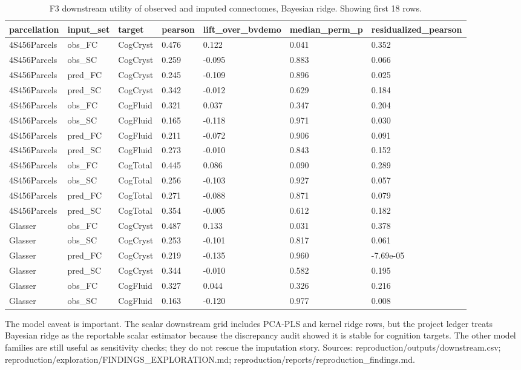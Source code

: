\documentclass{article}
\begin{document}
\begin{table}[H]
\centering
\scriptsize
\caption{F3 downstream utility of observed and imputed connectomes, Bayesian ridge. Showing first 18 rows.}
\label{tab:f3}
\begin{tabular}{lllllll}
\toprule
parcellation & input\_set & target & pearson & lift\_over\_bvdemo & median\_perm\_p & residualized\_pearson \\
\midrule
4S456Parcels & obs\_FC & CogCryst & 0.476 & 0.122 & 0.041 & 0.352 \\
4S456Parcels & obs\_SC & CogCryst & 0.259 & -0.095 & 0.883 & 0.066 \\
4S456Parcels & pred\_FC & CogCryst & 0.245 & -0.109 & 0.896 & 0.025 \\
4S456Parcels & pred\_SC & CogCryst & 0.342 & -0.012 & 0.629 & 0.184 \\
4S456Parcels & obs\_FC & CogFluid & 0.321 & 0.037 & 0.347 & 0.204 \\
4S456Parcels & obs\_SC & CogFluid & 0.165 & -0.118 & 0.971 & 0.030 \\
4S456Parcels & pred\_FC & CogFluid & 0.211 & -0.072 & 0.906 & 0.091 \\
4S456Parcels & pred\_SC & CogFluid & 0.273 & -0.010 & 0.843 & 0.152 \\
4S456Parcels & obs\_FC & CogTotal & 0.445 & 0.086 & 0.090 & 0.289 \\
4S456Parcels & obs\_SC & CogTotal & 0.256 & -0.103 & 0.927 & 0.057 \\
4S456Parcels & pred\_FC & CogTotal & 0.271 & -0.088 & 0.871 & 0.079 \\
4S456Parcels & pred\_SC & CogTotal & 0.354 & -0.005 & 0.612 & 0.182 \\
Glasser & obs\_FC & CogCryst & 0.487 & 0.133 & 0.031 & 0.378 \\
Glasser & obs\_SC & CogCryst & 0.253 & -0.101 & 0.817 & 0.061 \\
Glasser & pred\_FC & CogCryst & 0.219 & -0.135 & 0.960 & -7.69e-05 \\
Glasser & pred\_SC & CogCryst & 0.344 & -0.010 & 0.582 & 0.195 \\
Glasser & obs\_FC & CogFluid & 0.327 & 0.044 & 0.326 & 0.216 \\
Glasser & obs\_SC & CogFluid & 0.163 & -0.120 & 0.977 & 0.008 \\
\bottomrule
\end{tabular}
\end{table}

The model caveat is important. The scalar downstream grid includes PCA-PLS and kernel
ridge rows, but the project ledger treats Bayesian ridge as the reportable scalar
estimator because the discrepancy audit showed it is stable for cognition targets. The
other model families are still useful as sensitivity checks; they do not rescue the
imputation story.  Sources: reproduction/outputs/downstream.csv; reproduction/exploration/FINDINGS\_EXPLORATION.md; reproduction/reports/reproduction\_findings.md.
\end{document}
